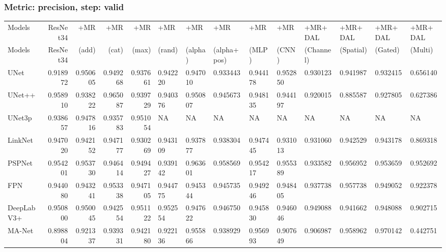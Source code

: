 \documentclass{article}
\begin{document}
\subsubsection{Metric: precision, step: valid}
\begin{tabular}{lrrrrlllllllll}
\toprule
Models & ResNet34 & +MR  & +MR  & +MR  & +MR  & +MR  & +MR  & +MR  & +MR  & +MR+DAL & +MR+DAL & +MR+DAL & +MR+DAL \\
Models & ResNet34 &  (add) &  (cat) &  (max) &  (rand) &  (alpha) &  (alpha+pos) &  (MLP) &  (CNN) & (Channel) & (Spatial) & (Gated) & (Multi) \\
\midrule
UNet & 0.918972 & 0.950605 & 0.949268 & 0.937661 & 0.942220 & 0.947010 & 0.933443 & 0.944178 & 0.952850 & 0.930123 & 0.941987 & 0.932415 & 0.656140 \\
UNet++ & 0.958910 & 0.938222 & 0.965087 & 0.939729 & 0.940376 & 0.950807 & 0.945673 & 0.948135 & 0.944197 & 0.920015 & 0.885587 & 0.927805 & 0.627386 \\
UNet3p & 0.938657 & 0.947816 & 0.935783 & 0.951054 & NA & NA & NA & NA & NA & NA & NA & NA & NA \\
LinkNet & 0.947020 & 0.942152 & 0.947177 & 0.930269 & 0.943109 & 0.937877 & 0.938304 & 0.947445 & 0.931013 & 0.931060 & 0.942529 & 0.943178 & 0.869318 \\
PSPNet & 0.954201 & 0.953730 & 0.946414 & 0.949427 & 0.939142 & 0.963601 & 0.958569 & 0.954217 & 0.955389 & 0.933582 & 0.956952 & 0.953659 & 0.952692 \\
FPN & 0.944080 & 0.943241 & 0.953338 & 0.947105 & 0.944775 & 0.945344 & 0.945735 & 0.949246 & 0.948405 & 0.937738 & 0.957738 & 0.949052 & 0.922378 \\
DeepLabV3+ & 0.950800 & 0.950045 & 0.942554 & 0.951122 & 0.952554 & 0.947622 & 0.946750 & 0.945830 & 0.946046 & 0.949088 & 0.941662 & 0.948088 & 0.902715 \\
MA-Net & 0.898804 & 0.921337 & 0.939331 & 0.942180 & 0.922136 & 0.955866 & 0.938929 & 0.956993 & 0.907649 & 0.906987 & 0.958962 & 0.970142 & 0.442751 \\
\bottomrule
\end{tabular}
\end{document}

